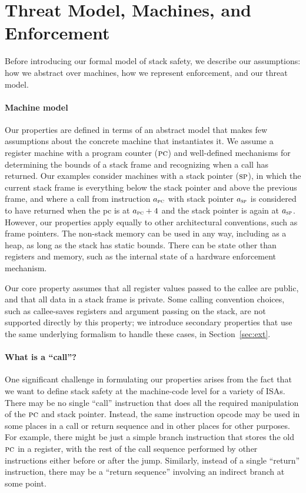 \documentclass[10pt,conference]{ieeetran}%
\theoremstyle{definition}
\begin{document}
\section{Threat Model, Machines, and Enforcement }
\label{sec:setup}
\label{sec:threat}

Before introducing our formal model of stack safety, we describe our assumptions:
how we abstract over machines, how we represent enforcement, and
our threat model.

\paragraph*{Machine model}
Our properties are defined in terms of an abstract model that makes few
assumptions about the concrete machine that instantiates it. We assume a
register machine with a program counter (\(\textsc{pc}\)) and well-defined
mechanisms for determining the bounds of a stack frame and recognizing when a call
has returned. Our examples consider machines with a stack pointer (\(\textsc{sp}\)),
in which the current stack frame is everything below the stack pointer and above the
previous frame, and where a call from instruction \(a_{\textsc{pc}}\) with
stack pointer \(a_{\textsc{sp}}\)
is considered to have returned when the pc is at \(a_{\textsc{pc}} + 4\) and the stack pointer
is again at \(a_{\textsc{sp}}\). However, our properties apply equally to
other architectural conventions, such as frame pointers.
The non-stack memory can be used in any way, including
as a heap, as long as the stack has static bounds. There can be
state other than registers and memory, such as the internal state of a hardware
enforcement mechanism.

Our core property assumes that all register values passed to the callee are public,
and that all data in a stack frame is private.
Some calling convention choices, such as callee-saves registers and argument
passing on the stack, are not supported directly by this property; we introduce
secondary properties that use the same underlying formalism to handle these cases,
in Section~\ref{sec:ext}.

\paragraph*{What is a ``call''?}  One significant challenge in formulating our
properties arises from the fact that we want to define stack safety at the
machine-code level for a variety of ISAs.  There may be no single ``call''
instruction that does all the
required manipulation of the \(\textsc{pc}\) and stack pointer. Instead, the
same instruction opcode may be
used in some places in a call or return sequence and in other places
for other purposes.
\ifspace
For example, there
might be just a simple branch instruction that stores the old \(\textsc{pc}\) in
a register, with the rest of the call sequence performed by other
instructions either before or after the jump.  Similarly, instead of a single
``return'' instruction,  there may be a ``return sequence'' involving an
indirect branch at some point.
\fi
\end{document}

